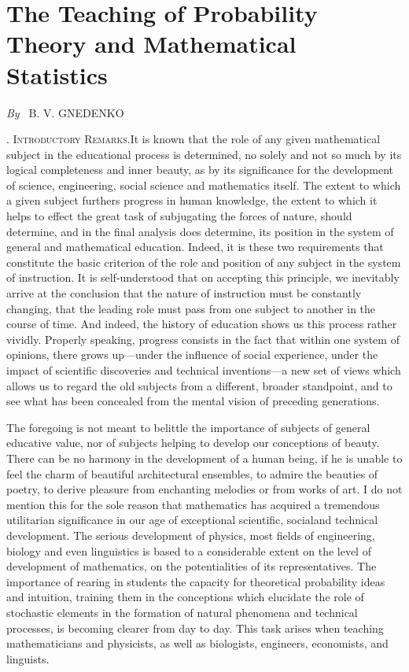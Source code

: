 
\chapter{The Teaching of Probability Theory and Mathematical Statistics}

\begin{center}
{\em By~} B. V. GNEDENKO
\end{center}

\setcounter{pageoriginal}{114}
. \textsc{Introductory Remarks.}\pageoriginale It is known that the
role of any given mathematical subject in the educational process is
determined, no solely and not so much by its logical completeness and
inner beauty, as by its significance for the development of science,
engineering, social science and mathematics itself. The extent to
which a given subject furthers progress in human knowledge, the extent
to which it helps to effect the great task of subjugating the forces
of nature, should determine, and in the final analysis does determine,
its position in the system of general and mathematical
education. Indeed, it is these two requirements that constitute the
basic criterion of the role and position of any subject in the system
of instruction. It is self-understood that on accepting this
principle, we inevitably arrive at the conclusion that the nature of
instruction must be constantly changing, that the leading role must
pass from one subject to another in the course of time. And indeed,
the history of education shows us this process rather
vividly. Properly speaking, progress consists in the fact that within
one system of opinions, there grows up---under the influence of social
experience, under the impact of scientific discoveries and technical
inventions---a new set of views which allows us to regard the old
subjects from a different, broader standpoint, and to see what has
been concealed from the mental vision of preceding generations. 

The foregoing is not meant to belittle the importance of subjects of
general educative value, nor of subjects helping to develop our
conceptions of beauty. There can be no harmony in the development of a
human being, if he is unable to feel the charm of beautiful
architectural ensembles, to admire the beauties of poetry, to derive
pleasure from enchanting melodies or from works of art. I do not
mention this for the sole reason that mathematics has acquired a
tremendous utilitarian significance in our age of exceptional
scientific, social\pageoriginale and technical development. The
serious development of physics, most fields of engineering, biology
and even linguistics is based to a considerable extent on the level of
development of mathematics, on the potentialities of its
representatives. The importance of rearing in students the capacity
for theoretical probability ideas and intuition, training them in the
conceptions which elucidate the role of stochastic elements in the
formation of natural phenomena and technical processes, is becoming
clearer from day to day. This task arises when teaching
mathematicians and physicists, as well as biologists, engineers,
economists, and linguists.

